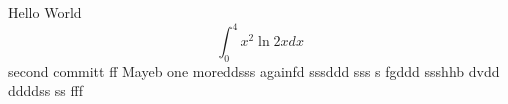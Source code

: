 \documentclass{article}
\begin{document}
Hello World
$$\int_0^4 x^2 \ln{2x}dx$$
second committ  ff
Mayeb
one moreddsss
againfd
sssddd sss
s fgddd
ssshhb dvdd ddddss ss fff
\end{document}

